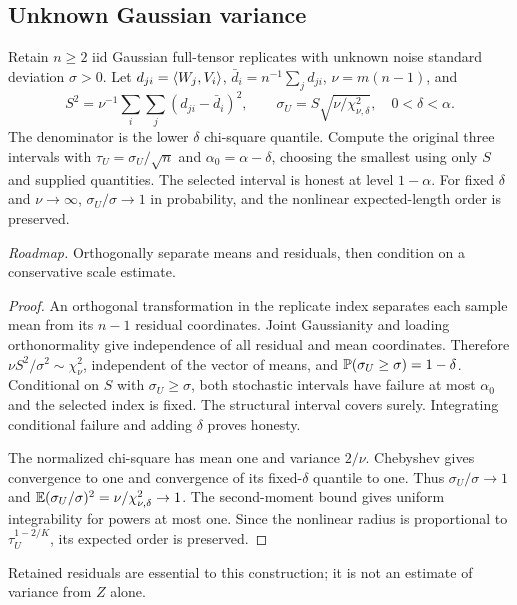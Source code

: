 \subsection{Unknown Gaussian variance}
\begin{proposition}\label{prop:variance}
Retain $n\ge2$ iid Gaussian full-tensor replicates with unknown noise standard deviation $\sigma>0$.
Let $d_{ji}=\langle W_j,V_i\rangle$, $\bar d_i=n^{-1}\sum_jd_{ji}$, $\nu=m(n-1)$, and
\[
 S^2=\nu^{-1}\sum_i\sum_j(d_{ji}-\bar d_i)^2,\qquad
 \sigma_U=S\sqrt{\nu/\chi^2_{\nu,\delta}},\quad 0<\delta<\alpha.
\]
The denominator is the lower $\delta$ chi-square quantile.
Compute the original three intervals with $\tau_U=\sigma_U/\sqrt n$ and
$\alpha_0=\alpha-\delta$, choosing the smallest using only $S$ and supplied quantities.
The selected interval is honest at level $1-\alpha$.
For fixed $\delta$ and $\nu\to\infty$, $\sigma_U/\sigma\to1$ in probability,
and the nonlinear expected-length order is preserved.
\end{proposition}
\noindent\emph{Roadmap.} Orthogonally separate means and residuals, then condition on a conservative scale estimate.
\begin{proof}
An orthogonal transformation in the replicate index separates each sample mean from its $n-1$ residual coordinates. Joint Gaussianity and loading orthonormality give independence of all residual and mean coordinates.
Therefore $\nu S^2/\sigma^2\sim\chi^2_\nu$, independent of the vector of means, and
$\mathbb P(\sigma_U\ge\sigma)=1-\delta$.
Conditional on $S$ with $\sigma_U\ge\sigma$, both stochastic intervals have failure at most $\alpha_0$ and the selected index is fixed. The structural interval covers surely. Integrating conditional failure and adding $\delta$ proves honesty.

The normalized chi-square has mean one and variance $2/\nu$.
Chebyshev gives convergence to one and convergence of its fixed-$\delta$ quantile to one. Thus $\sigma_U/\sigma\to1$ and
$\mathbb E(\sigma_U/\sigma)^2=\nu/\chi^2_{\nu,\delta}\to1$.
The second-moment bound gives uniform integrability for powers at most one.
Since the nonlinear radius is proportional to $\tau_U^{1-2/K}$, its expected order is preserved.
\end{proof}
Retained residuals are essential to this construction; it is not an estimate of variance from $Z$ alone.

